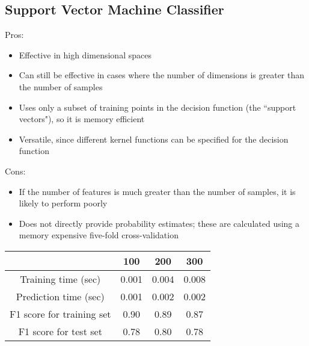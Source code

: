 \documentclass[12 pt]{article}
\numberwithin{equation}{section}
\begin{document}
\subsection{Support Vector Machine Classifier}
Pros:
\begin{itemize}
	\item Effective in high dimensional spaces
	\item Can still be effective in cases where the number of dimensions is greater than the number of samples
	\item Uses only a subset of training points in the decision function (the ``support vectors"), so it is memory efficient
	\item Versatile, since different kernel functions can be specified for the decision function
\end{itemize}
Cons:
\begin{itemize}
	\item If the number of features is much greater than the number of samples, it is likely to perform poorly
	\item Does not directly provide probability estimates; these are calculated using a memory expensive five-fold cross-validation
\end{itemize}

\begin{center}
  \begin{tabular}{| c | c | c | c | }
    \hline
    & 100 & 200 & 300 \\ \hline
    Training time (sec) & 0.001 & 0.004 & 0.008 \\ \hline
    Prediction time (sec) & 0.001 & 0.002 & 0.002 \\ \hline 
    F1 score for training set & 0.90 & 0.89 & 0.87 \\ \hline
    F1 score for test set & 0.78 & 0.80 & 0.78 \\ \hline
  \end{tabular}
\end{center}
\end{document}

